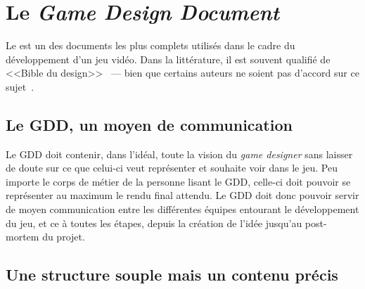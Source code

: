 \section{Le \emph{Game Design Document}}
\label{sect.GDD}





Le  est un des documents les plus complets utilis\'es dans le cadre du développement d'un jeu vidéo.
Dans la littérature, il est souvent qualifié de <<Bible du design>>~\cite{GD_foundations_pedersen} --- bien que certains auteurs ne soient pas d'accord sur ce sujet~\cite{LevelUpRogers2014}. 

\subsection{Le GDD, un moyen de communication}


Le GDD doit contenir, dans l'idéal, toute la vision du \emph{game designer} sans laisser de doute sur ce que celui-ci veut représenter et souhaite voir dans le jeu.
Peu importe le corps de métier de la personne lisant le GDD, celle-ci doit pouvoir se représenter au maximum le rendu final attendu.
Le GDD doit donc pouvoir servir de moyen communication entre les différentes équipes entourant le développement du jeu, et ce \`a toutes les étapes, depuis la création de l'idée jusqu'au post-mortem du projet.

\subsection{Une structure souple mais un contenu précis}


